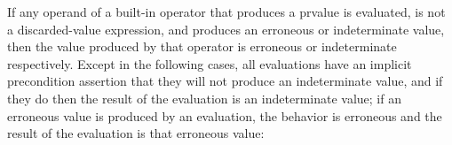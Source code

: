 \pnum
If any operand of a built-in operator that produces a prvalue
is evaluated,
is not a discarded-value expression, and
produces an erroneous or indeterminate value,
then the value produced by that operator is
erroneous or indeterminate respectively.
Except in the following cases,
all evaluations have an implicit precondition assertion
that they will not produce an indeterminate value,
%
%
%
%
%
and if they do then the result of the evaluation is
an indeterminate value;
if an erroneous value is produced by an evaluation,
the behavior is erroneous
and
the result of the evaluation is that erroneous value:
